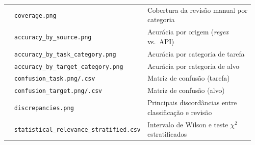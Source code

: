 \begin{longtable}{llp{6.5cm}}
 & \texttt{coverage.png}                   & Cobertura da revisão manual por categoria \\
 & \texttt{accuracy\_by\_source.png}       & Acurácia por origem (\textit{regex} vs.\ API) \\
 & \texttt{accuracy\_by\_task\_category.png}  & Acurácia por categoria de tarefa \\
 & \texttt{accuracy\_by\_target\_category.png}& Acurácia por categoria de alvo \\
 & \texttt{confusion\_task.png/.csv}       & Matriz de confusão (tarefa) \\
 & \texttt{confusion\_target.png/.csv}     & Matriz de confusão (alvo) \\
 & \texttt{discrepancies.png}              & Principais discordâncias entre classificação e revisão \\
 & \texttt{statistical\_relevance\_stratified.csv} & Intervalo de Wilson e teste $\chi^{2}$ estratificados \\
\end{longtable}



%
%
